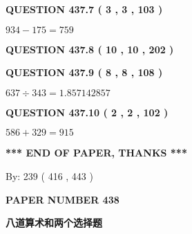 \documentclass{ctexart}
\begin{document}
{\textbf{\Large{QUESTION
437.7 
 ( 3 , 3 , 103 )
}}}
  
  
 
 

$ %
934 -  %
175=   %
759$
 
 
  
\vspace{0.2in}
  
{\textbf{\Large{QUESTION
437.8 
 ( 10 , 10 , 202 )
}}}
  
  
  
\vspace{0.2in}
  
{\textbf{\Large{QUESTION
437.9 
 ( 8 , 8 , 108 )
}}}
  
  
 
 

$ %
637 \div  %
343=   %
1.857142857$
 
 
  
\vspace{0.2in}
  
{\textbf{\Large{QUESTION
437.10 
 ( 2 , 2 , 102 )
}}}
  
  
 
 

$ %
586 +  %
329=   %
915$
 
 
   
   
 \vspace{0.2in}
 
   
   
   
   
\vspace{1.0in} 
{\textbf{\large{ *** END OF PAPER, THANKS *** }}} 
   
   
\hspace{1.0in} By: 
 239 ( 416 ,  443 )
   
   
   
   
\newpage 
\setcounter{page}{ 
   438001 } 
   
   
   
   
 {\textbf{ \Large{ PAPER NUMBER  438  }}}
   
   
\vspace{0.2in}
   
   
   
   
   
   
 \vspace{0.2in}
{\LARGE {\textbf{ 八道算术和两个选择题}}}
   
\end{document}
